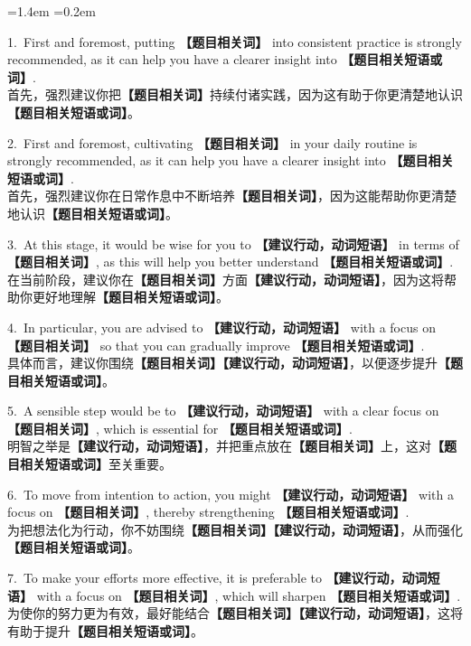 \documentclass[11pt,a4paper]{ctexart}
\newcommand{\fillin}[1]{{\bfseries【#1】}}
\newenvironment{eg}{%
  \par\addvspace{4pt}%
  \begin{list}{}{\leftmargin=1.4em \rightmargin=0.2em \listparindent=0pt
    \itemindent=0pt \topsep=0pt \parsep=2pt \itemsep=2pt \partopsep=0pt}%
  \item\relax
}{%
  \end{list}\addvspace{5pt}%
}
\begin{document}
\begin{eg}
1.\ First and foremost, putting \fillin{题目相关词} into consistent practice is strongly recommended, as it can help you have a clearer insight into \fillin{题目相关短语或词}.\\
首先，强烈建议你把\fillin{题目相关词}持续付诸实践，因为这有助于你更清楚地认识\fillin{题目相关短语或词}。

2.\ First and foremost, cultivating \fillin{题目相关词} in your daily routine is strongly recommended, as it can help you have a clearer insight into \fillin{题目相关短语或词}.\\
首先，强烈建议你在日常作息中不断培养\fillin{题目相关词}，因为这能帮助你更清楚地认识\fillin{题目相关短语或词}。

3.\ At this stage, it would be wise for you to \fillin{建议行动，动词短语} in terms of \fillin{题目相关词}, as this will help you better understand \fillin{题目相关短语或词}.\\
在当前阶段，建议你在\fillin{题目相关词}方面\fillin{建议行动，动词短语}，因为这将帮助你更好地理解\fillin{题目相关短语或词}。

4.\ In particular, you are advised to \fillin{建议行动，动词短语} with a focus on \fillin{题目相关词} so that you can gradually improve \fillin{题目相关短语或词}.\\
具体而言，建议你围绕\fillin{题目相关词}\fillin{建议行动，动词短语}，以便逐步提升\fillin{题目相关短语或词}。

5.\ A sensible step would be to \fillin{建议行动，动词短语} with a clear focus on \fillin{题目相关词}, which is essential for \fillin{题目相关短语或词}.\\
明智之举是\fillin{建议行动，动词短语}，并把重点放在\fillin{题目相关词}上，这对\fillin{题目相关短语或词}至关重要。

6.\ To move from intention to action, you might \fillin{建议行动，动词短语} with a focus on \fillin{题目相关词}, thereby strengthening \fillin{题目相关短语或词}.\\
为把想法化为行动，你不妨围绕\fillin{题目相关词}\fillin{建议行动，动词短语}，从而强化\fillin{题目相关短语或词}。

7.\ To make your efforts more effective, it is preferable to \fillin{建议行动，动词短语} with a focus on \fillin{题目相关词}, which will sharpen \fillin{题目相关短语或词}.\\
为使你的努力更为有效，最好能结合\fillin{题目相关词}\fillin{建议行动，动词短语}，这将有助于提升\fillin{题目相关短语或词}。
\end{eg}
\end{document}
